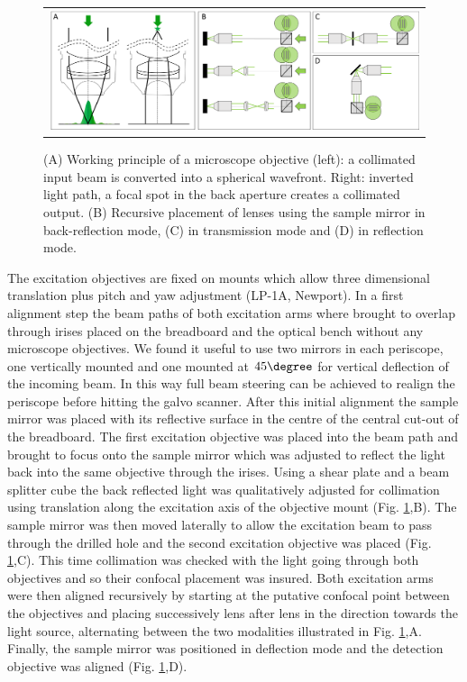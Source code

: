 \documentclass[12pt]{spieman}  %
\begin{document}
\begin{spacing}{2}
\begin{figure}
   \begin{center}
   \begin{tabular}{c}
   \includegraphics[width=\textwidth]{Panel4.eps}
   \end{tabular}
   \end{center}
   \caption{\label{fig:alignment2} (A) Working principle of a microscope objective (left): a collimated input beam is converted into a spherical wavefront. Right: inverted light path, a focal spot in the back aperture creates a collimated output. (B) Recursive placement of lenses using the sample mirror in back-reflection mode, (C) in transmission mode and (D) in reflection mode.} 
   \end{figure}

The excitation objectives are fixed on mounts which allow three dimensional translation plus pitch and yaw adjustment (LP-1A, Newport). In a first alignment step the beam paths of both excitation arms where brought to overlap through irises placed on the breadboard and the optical bench without any microscope objectives. We found it useful to use two mirrors in each periscope, one vertically mounted and one mounted at $45\degree$ for vertical deflection of the incoming beam. In this way full beam steering can be achieved to realign the periscope before hitting the galvo scanner. After this initial alignment the sample mirror was placed with its reflective surface in the centre of the central cut-out of the breadboard. The first excitation objective was placed into the beam path and brought to focus onto the sample mirror which was adjusted to reflect the light back into the same objective through the irises. Using a shear plate and a beam splitter cube the back reflected light was qualitatively adjusted for collimation using translation along the excitation axis of the objective mount (Fig. \ref{fig:alignment2},B). The sample mirror was then moved laterally to allow the excitation beam to pass through the drilled hole and the second excitation objective was placed (Fig. \ref{fig:alignment2},C). This time collimation was checked with the light going through both objectives and so their confocal placement was insured. Both excitation arms were then aligned recursively by starting at the putative confocal point between the objectives and placing successively lens after lens in the direction towards the light source, alternating between the two modalities illustrated in Fig. \ref{fig:alignment2},A. Finally, the sample mirror was positioned in deflection mode and the detection objective was aligned (Fig. \ref{fig:alignment2},D). 


\end{spacing}
\end{document}
